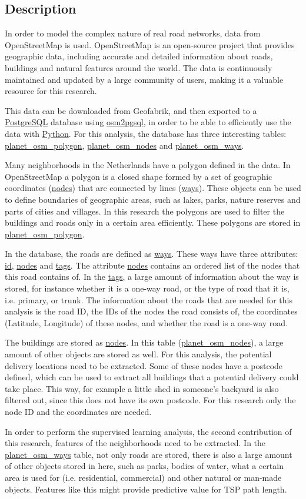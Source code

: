 \subsection{Description}
In order to model the complex nature of real road networks, data from OpenStreetMap \citep{openstreetmap} is used.
OpenStreetMap is an open-source project that provides geographic data, including accurate and
detailed information about roads, buildings and natural features around the world. The data is
continuously maintained and updated by a large community of users, making it a valuable resource
for this research.

This data can be downloaded from Geofabrik, and then exported to a \url{PostgreSQL} database using
\url{osm2pgsql}, in order to be able to efficiently use the data with \url{Python}.
For this analysis, the database has three interesting tables: \url{planet_osm_polygon}, \url{planet_osm_nodes} and \url{planet_osm_ways}.

Many neighborhoods in the Netherlands have a polygon defined in the data.
In OpenStreetMap a polygon is a closed shape formed by a set of geographic coordinates
(\url{nodes}) that are connected by lines (\url{ways}). These objects can be used to define boundaries of
geographic areas, such as lakes, parks, nature reserves and parts of cities and villages. In this
research the polygons are used to filter the buildings and roads only in a certain area efficiently.
These polygons are stored in \url{planet_osm_polygon}.

In the database, the roads are defined as \url{ways}. These ways have three
attributes: \url{id}, \url{nodes} and \url{tags}. The attribute \url{nodes} contains an ordered list
of the nodes that this road contains of. In the \url{tags}, a large amount of
information about the way is stored, for instance whether it is a
one-way road, or the type of road that it is, i.e. primary, or trunk.
The information about the roads that are needed for this analysis is the
road ID, the IDs of the nodes the road consists of, the coordinates
(Latitude, Longitude) of these nodes, and whether the road is a one-way
road.

The buildings are stored as \url{nodes}. In this table (\url{planet_osm_nodes}),
a large amount of other objects are stored as well. For this analysis,
the potential delivery locations need to be extracted. Some of these
nodes have a postcode defined, which can be used to extract all buildings
that a potential delivery could take place. This way, for example a little shed in
someone's backyard is also filtered out, since this does not have its own
postcode. For this research only the node ID and the coordinates are
needed.

In order to perform the supervised learning analysis, the second contribution of this research,
features of the neighborhoods need to be extracted. In the \url{planet_osm_ways} table, not only roads are stored,
there is also a large amount of other objects stored in here, such as parks, bodies of water, what a certain area is used for
(i.e. residential, commercial) and other natural or man-made
objects. Features like this might provide predictive value for TSP path length.
